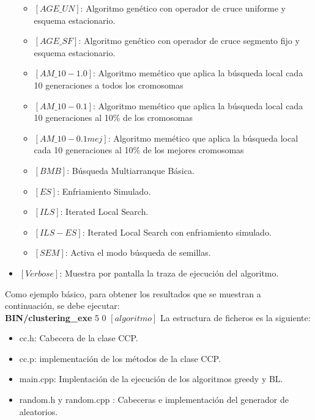 \begin{itemize}
\begin{itemize}
      \item $[AGE\_UN]$: Algoritmo genético con operador de cruce uniforme y esquema estacionario.
      \item $[AGE\_SF]$: Algoritmo genético con operador de cruce segmento fijo y esquema estacionario.
      \item $[AM\_10-1.0]$: Algoritmo memético que aplica la búsqueda local cada 10 generaciones a todos los cromosomas
      \item $[AM\_10-0.1]$: Algoritmo memético que aplica la búsqueda local cada 10 generaciones al 10\% de los cromosomas
      \item $[AM\_10-0.1mej]$: Algoritmo memético que aplica la búsqueda local cada 10 generaciones al 10\% de los mejores cromosomas
      \item $[BMB]$: Búsqueda Multiarranque Básica.
      \item $[ES]$: Enfriamiento Simulado.
      \item $[ILS]$: Iterated Local Search.
      \item $[ILS-ES]$: Iterated Local Search con enfriamiento simulado.
      \item $[SEM]$: Activa el modo búsqueda de semillas.
   \end{itemize}
   \item $[Verbose]$: Muestra por pantalla la traza de ejecución del algoritmo.
\end{itemize}

Como ejemplo básico, para obtener los resultados que se muestran a continuación, se debe ejecutar:\\ \textbf{BIN/clustering\_exe} 5 0 $[algoritmo]$
\newpage
La estructura de ficheros es la siguiente:
\begin{itemize}
   \item cc.h: Cabecera de la clase CCP.
   \item cc.p: implementación de los métodos de la clase CCP.
   \item main.cpp: Implentación de la ejecución de los algoritmos greedy y BL.
   \item random.h y random.cpp : Cabeceras e implementación del generador de aleatorios.
\end{itemize}
